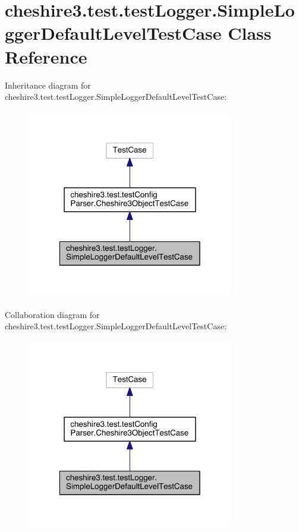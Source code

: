 \hypertarget{classcheshire3_1_1test_1_1test_logger_1_1_simple_logger_default_level_test_case}{\section{cheshire3.\-test.\-test\-Logger.\-Simple\-Logger\-Default\-Level\-Test\-Case Class Reference}
\label{classcheshire3_1_1test_1_1test_logger_1_1_simple_logger_default_level_test_case}
}


Inheritance diagram for cheshire3.\-test.\-test\-Logger.\-Simple\-Logger\-Default\-Level\-Test\-Case\-:
\nopagebreak
\begin{figure}[H]
\begin{center}
\leavevmode
\includegraphics[width=256pt]{classcheshire3_1_1test_1_1test_logger_1_1_simple_logger_default_level_test_case__inherit__graph}
\end{center}
\end{figure}


Collaboration diagram for cheshire3.\-test.\-test\-Logger.\-Simple\-Logger\-Default\-Level\-Test\-Case\-:
\nopagebreak
\begin{figure}[H]
\begin{center}
\leavevmode
\includegraphics[width=256pt]{classcheshire3_1_1test_1_1test_logger_1_1_simple_logger_default_level_test_case__coll__graph}
\end{center}
\end{figure}
